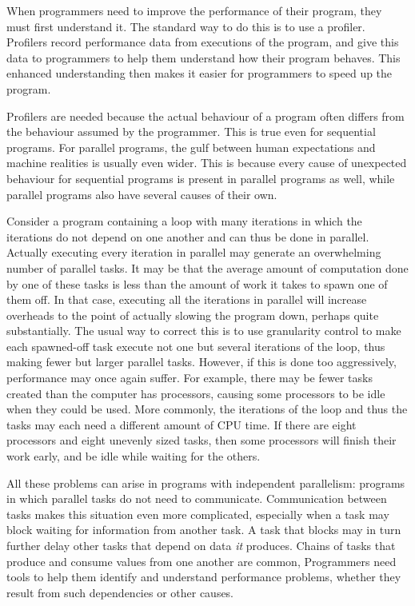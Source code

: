 When programmers need to improve the performance of their program,
they must first understand it.
The standard way to do this is to use a profiler.
Profilers record performance data from executions of the program,
and give this data to programmers
to help them understand how their program behaves.
This enhanced understanding then makes it easier
for programmers to speed up the program.

Profilers are needed because the actual behaviour of a program
often differs from the behaviour assumed by the programmer.
This is true even for sequential programs.
For parallel programs,
the gulf between human expectations and machine realities
is usually even wider.
This is because every cause of unexpected behaviour
for sequential programs
is present in parallel programs as well,
while parallel programs also have several causes of their own.

Consider a program containing a loop with many iterations
in which the iterations do not depend on one another
and can thus be done in parallel.
Actually executing every iteration in parallel
may generate an overwhelming number of parallel tasks.
It may be that the average amount of computation done by one of these tasks
is less than the amount of work it takes to spawn one of them off.
In that case, executing all the iterations in parallel
will increase overheads to the point of actually slowing the program down,
perhaps quite substantially.
The usual way to correct this is to use granularity control
to make each spawned-off task execute
not one but several iterations of the loop,
thus making fewer but larger parallel tasks.
However, if this is done too aggressively,
performance may once again suffer.
For example,
there may be fewer tasks created than the computer has processors,
causing some processors to be idle when they could be used.
More commonly, the iterations of the loop and thus the tasks
may each need a different amount of CPU time.
If there are eight processors and eight unevenly sized tasks,
then some processors will finish their work early,
and be idle while waiting for the others.

All these problems can arise in programs with independent parallelism:
programs in which parallel tasks do not need to communicate.
Communication between tasks makes this situation even more complicated,
especially when a task may block waiting for information from another task.
A task that blocks may in turn further delay
other tasks that depend on data \emph{it} produces.
Chains of tasks that produce and consume values from one another are common,
Programmers need tools to help them
identify and understand performance problems,
whether they result from such dependencies or other causes.


